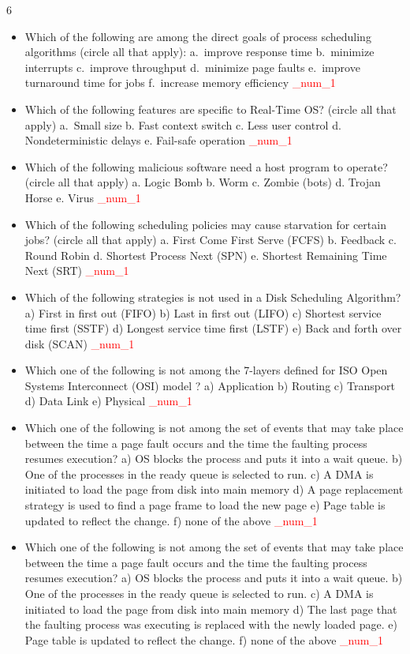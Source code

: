 \documentclass[9pt,landscape]{memoir}
\newcommand{\answer}[1]{\textcolor{red}{_num_1}}
\begin{document}
\begin{multicols}{6}
\begin{itemize}
    \item Which of the following are among the direct goals of process scheduling algorithms (circle all that apply): a.~improve response time b.~minimize interrupts c.~improve throughput d.~minimize page faults e.~improve turnaround time for jobs f.~increase memory efficiency \answer{a, c, e}
    \item Which of the following features are specific to Real-Time OS? (circle all that apply) a.~Small size b. Fast context switch c. Less user control d. Nondeterministic delays e. Fail-safe operation \answer{a, b. e}
    \item Which of the following malicious software need a host program to operate? (circle all that apply) a. Logic Bomb b. Worm c. Zombie (bots) d. Trojan Horse e. Virus \answer{a, d, e}
    \item Which of the following scheduling policies may cause starvation for certain jobs? (circle all that apply) a. First Come First Serve (FCFS) b. Feedback c. Round Robin d. Shortest Process Next (SPN) e. Shortest Remaining Time Next (SRT) \answer{b, d, e}
    \item Which of the following strategies is not used in a Disk Scheduling Algorithm? a) First in first out (FIFO) b) Last in first out (LIFO) c) Shortest service time first (SSTF) d) Longest service time first (LSTF) e) Back and forth over disk (SCAN) \answer{d}
    \item Which one of the following is not among the 7-layers defined for ISO Open Systems Interconnect (OSI) model ? a) Application b) Routing c) Transport d) Data Link e) Physical \answer{b}
    \item Which one of the following is not among the set of events that may take place between the time a page fault occurs and the time the faulting process resumes execution? a) OS blocks the process and puts it into a wait queue. b) One of the processes in the ready queue is selected to run. c) A DMA is initiated to load the page from disk into main memory d) A page replacement strategy is used to find a page frame to load the new page e) Page table is updated to reflect the change. f) none of the above \answer{f}
    \item Which one of the following is not among the set of events that may take place between the time a page fault occurs and the time the faulting process resumes execution? a) OS blocks the process and puts it into a wait queue. b) One of the processes in the ready queue is selected to run. c) A DMA is initiated to load the page from disk into main memory d) The last page that the faulting process was executing is replaced with the newly loaded page. e) Page table is updated to reflect the change. f) none of the above \answer{d}

\end{itemize}
\end{multicols}
\end{document}
